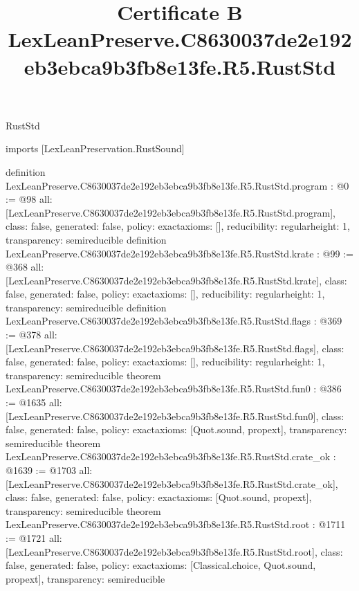 \begin{lexlean}{RustStd}
\title{Certificate B LexLeanPreserve.C8630037de2e192eb3ebca9b3fb8e13fe.R5.RustStd}
\begin{coremodule}
imports [LexLeanPreservation.RustSound]

definition LexLeanPreserve.C8630037de2e192eb3ebca9b3fb8e13fe.R5.RustStd.program : @0 := @98 {
  all: [LexLeanPreserve.C8630037de2e192eb3ebca9b3fb8e13fe.R5.RustStd.program],
  class: false,
  generated: false,
  policy: exact{axioms: []},
  reducibility: regular{height: 1},
  transparency: semireducible
}
definition LexLeanPreserve.C8630037de2e192eb3ebca9b3fb8e13fe.R5.RustStd.krate : @99 := @368 {
  all: [LexLeanPreserve.C8630037de2e192eb3ebca9b3fb8e13fe.R5.RustStd.krate],
  class: false,
  generated: false,
  policy: exact{axioms: []},
  reducibility: regular{height: 1},
  transparency: semireducible
}
definition LexLeanPreserve.C8630037de2e192eb3ebca9b3fb8e13fe.R5.RustStd.flags : @369 := @378 {
  all: [LexLeanPreserve.C8630037de2e192eb3ebca9b3fb8e13fe.R5.RustStd.flags],
  class: false,
  generated: false,
  policy: exact{axioms: []},
  reducibility: regular{height: 1},
  transparency: semireducible
}
theorem LexLeanPreserve.C8630037de2e192eb3ebca9b3fb8e13fe.R5.RustStd.fun0 : @386 := @1635 {
  all: [LexLeanPreserve.C8630037de2e192eb3ebca9b3fb8e13fe.R5.RustStd.fun0],
  class: false,
  generated: false,
  policy: exact{axioms: [Quot.sound, propext]},
  transparency: semireducible
}
theorem LexLeanPreserve.C8630037de2e192eb3ebca9b3fb8e13fe.R5.RustStd.crate_ok : @1639 := @1703 {
  all: [LexLeanPreserve.C8630037de2e192eb3ebca9b3fb8e13fe.R5.RustStd.crate_ok],
  class: false,
  generated: false,
  policy: exact{axioms: [Quot.sound, propext]},
  transparency: semireducible
}
theorem LexLeanPreserve.C8630037de2e192eb3ebca9b3fb8e13fe.R5.RustStd.root : @1711 := @1721 {
  all: [LexLeanPreserve.C8630037de2e192eb3ebca9b3fb8e13fe.R5.RustStd.root],
  class: false,
  generated: false,
  policy: exact{axioms: [Classical.choice, Quot.sound, propext]},
  transparency: semireducible
}


\end{coremodule}
\end{lexlean}
